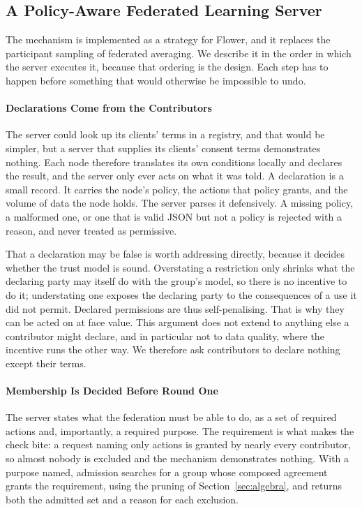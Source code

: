 \documentclass[10pt,conference]{IEEEtran}
\begin{document}
\subsection{A Policy-Aware Federated Learning Server}
\label{sec:system}

The mechanism is implemented as a strategy for Flower, and it replaces the
participant sampling of federated averaging. We describe it in the order in
which the server executes it, because that ordering is the design. Each step
has to happen before something that would otherwise be impossible to undo.

\paragraph{Declarations Come from the Contributors}

The server could look up its clients' terms in a registry, and that would be
simpler, but a server that supplies its clients' consent terms demonstrates
nothing. Each node therefore translates its own conditions locally and declares
the result, and the server only ever acts on what it was told. A declaration is a small record. It carries the node's policy, the actions that policy grants, and the volume of data the node holds. The server parses it defensively. A missing policy, a malformed one, or one that is valid JSON but not a policy is rejected with a reason, and never treated as permissive.

That a declaration may be false is worth addressing directly, because it decides
whether the trust model is sound. Overstating a restriction only shrinks what
the declaring party may itself do with the group's model, so there is no
incentive to do it; understating one exposes the declaring party to the
consequences of a use it did not permit. Declared permissions are thus self-penalising. That is why they can be acted on at face value. This argument
does not extend to anything else a contributor might declare, and in particular
not to data quality, where the incentive runs the other way. We therefore ask
contributors to declare nothing except their terms.

\paragraph{Membership Is Decided Before Round One}

The server states what the federation must be able to do, as a set of required
actions and, importantly, a required purpose. The requirement is what makes the
check bite: a request naming only actions is granted by nearly every
contributor, so almost nobody is excluded and the mechanism demonstrates
nothing. With a purpose named, admission searches for a group whose composed
agreement grants the requirement, using the pruning of
Section~\ref{sec:algebra}, and returns both the admitted set and a reason for
each exclusion.
\end{document}

